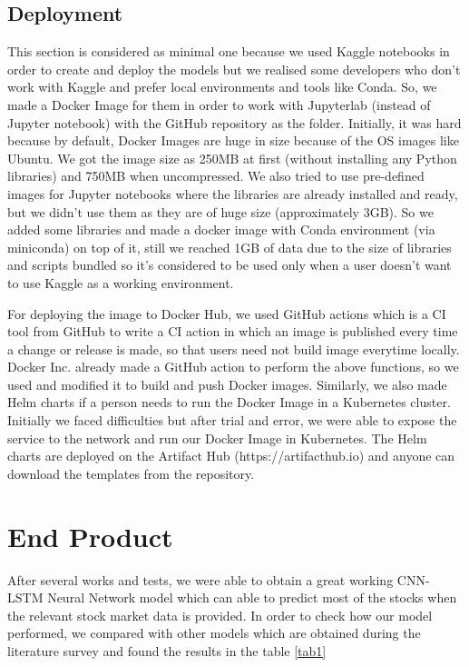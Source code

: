 \documentclass[conference]{IEEEtran}
\begin{document}
\subsection{Deployment}
This section is considered as minimal one because we used Kaggle notebooks in order to create and deploy the models but we realised some developers who don't work with Kaggle and prefer local environments and tools like Conda. So, we made a Docker Image for them in order to work with Jupyterlab (instead of Jupyter notebook) with the GitHub repository as the folder. Initially, it was hard because by default, Docker Images are huge in size because of the OS images like Ubuntu. We got the image size as 250MB at first (without installing any Python libraries) and 750MB when uncompressed. We also tried to use pre-defined images for Jupyter notebooks where the libraries are already installed and ready, but we didn't use them as they are of huge size (approximately 3GB). So we added some libraries and made a docker image with Conda environment (via miniconda) on top of it, still we reached 1GB of data due to the size of libraries and scripts bundled so it's considered to be used only when a user doesn't want to use Kaggle as a working environment.

For deploying the image to Docker Hub, we used GitHub actions which is a CI tool from GitHub to write a CI action in which an image is published every time a change or release is made, so that users need not build image everytime locally. Docker Inc. already made a GitHub action \cite{b13} to perform the above functions, so we used and modified it to build and push Docker images. Similarly, we also made Helm charts if a person needs to run the Docker Image in a Kubernetes cluster. Initially we faced difficulties but after trial and error, we were able to expose the service to the network and run our Docker Image in Kubernetes. The Helm charts are deployed on the Artifact Hub (https://artifacthub.io) and anyone can download the templates from the repository.

\FloatBarrier
\section{End Product}

After several works and tests, we were able to obtain a great working CNN-LSTM Neural Network model which can able to predict most of the stocks when the relevant stock market data is provided. In order to check how our model performed, we compared with other models which are obtained during the literature survey and found the results in the table \ref{tab1}
\end{document}

